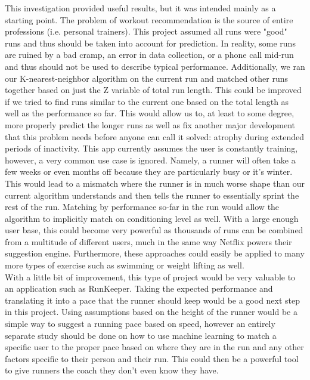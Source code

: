 \documentclass[twoside]{article}
\begin{document}
\begin{multicols}{2}
	This investigation provided useful results, but it was intended mainly as a starting point. The problem of workout recommendation is the source of entire professions (i.e. personal trainers). This project assumed all runs were "good" runs and thus should be taken into account for prediction. In reality, some runs are ruined by a bad cramp, an error in data collection, or a phone call mid-run and thus should not be used to describe typical performance. Additionally, we ran our K-nearest-neighbor algorithm on the current run and matched other runs together based on just the Z variable of total run length. This could be improved if we tried to find runs similar to the current one based on the total length as well as the performance so far. This would allow us to, at least to some degree, more properly predict the longer runs as well as fix another major development that this problem needs before anyone can call it solved: atrophy during extended periods of inactivity. This app currently assumes the user is constantly training, however, a very common use case is ignored. Namely, a runner will often take a few weeks or even months off because they are particularly busy or it's winter. This would lead to a mismatch where the runner is in much worse shape than our current algorithm understands and then tells the runner to essentially sprint the rest of the run. Matching by performance so-far in the run would allow the algorithm to implicitly match on conditioning level as well. With a large enough user base, this could become very powerful as thousands of runs can be combined from a multitude of different users, much in the same way Netflix powers their suggestion engine. Furthermore, these approaches could easily be applied to many more types of exercise such as swimming or weight lifting as well. \\
	
	With a little bit of improvement, this type of project would be very valuable to an application such as RunKeeper. Taking the expected performance and translating it into a pace that the runner should keep would be a good next step in this project. Using assumptions based on the height of the runner would be a simple way to suggest a running pace based on speed, however an entirely separate study should be done on how to use machine learning to match a specific user to the proper pace based on where they are in the run and any other factors specific to their person and their run. This could then be a powerful tool to give runners the coach they don't even know they have. 


\end{multicols}
\end{document}
